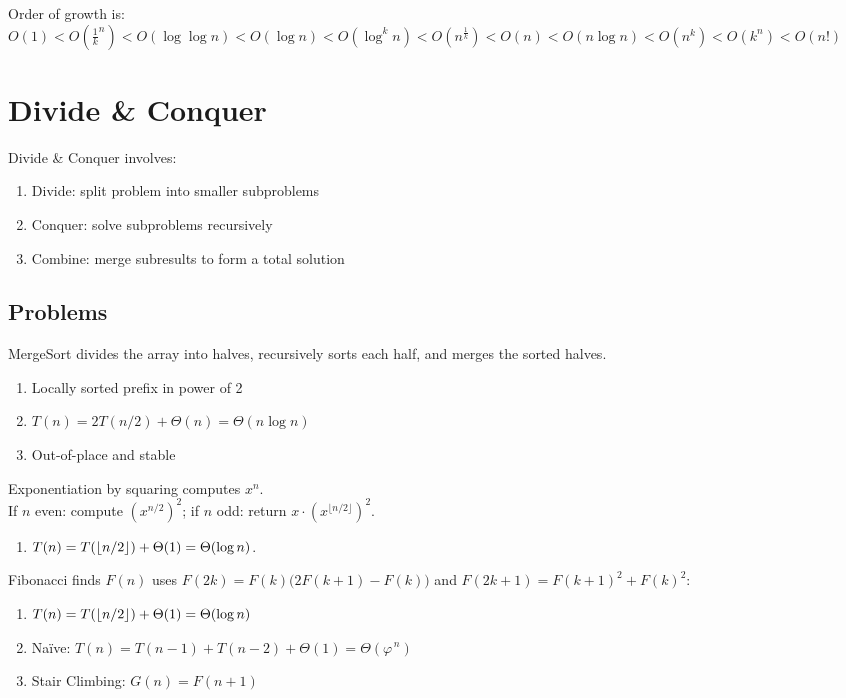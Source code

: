 \documentclass[12pt, a4paper]{article}
\begin{document}
\begin{multicols*}{3}
Order of growth is:\\
$O(1) < O(\frac{1}{k}^n) < O(\log\log n) < O(\log n) < O(\log^k n) < O(n^{\frac{1}{k}}) < O(n) < O(n\log n) < O(n^k) < O(k^n) < O(n!)$


\colbreak

\section{Divide \& Conquer}

Divide \& Conquer involves:
\begin{enumerate}[\roman*.]
  \item Divide: split problem into smaller subproblems
  \item Conquer: solve subproblems recursively
  \item Combine: merge subresults to form a total solution
\end{enumerate}

\subsection{Problems}

MergeSort divides the array into halves, recursively sorts each half, and merges the sorted halves.
\begin{enumerate}[\roman*.]
  \item Locally sorted prefix in power of 2
  \item $T(n) = 2T(n /2) + \Theta(n) = \Theta(n\log n)$
  \item Out-of-place and stable
\end{enumerate}

Exponentiation by squaring computes $x^n$.\\If $n$ even: compute $(x^{n/2})^2$; if $n$ odd: return $x \cdot (x^{\lfloor n/2\rfloor})^2$. 
\begin{enumerate}[\roman*.]
  \item $T(n)=T(\lfloor n/2 \rfloor)+\Theta(1)=\Theta(\log n)$.
\end{enumerate}

Fibonacci finds $F(n)$ uses $F(2k)=F(k)\big(2F(k{+}1)-F(k)\big)$ and
$F(2k{+}1)=F(k{+}1)^2+F(k)^2$:
\begin{enumerate}[\roman*.]
  \item $T(n)=T(\lfloor n/2 \rfloor)+\Theta(1)=\Theta(\log n)$
  \item Naïve: $T(n)=T(n-1)+T(n-2)+\Theta(1)=\Theta(\varphi^{\,n})$
  \item Stair Climbing: $G(n) = F(n+1)$
\end{enumerate}


\end{multicols*}
\end{document}
